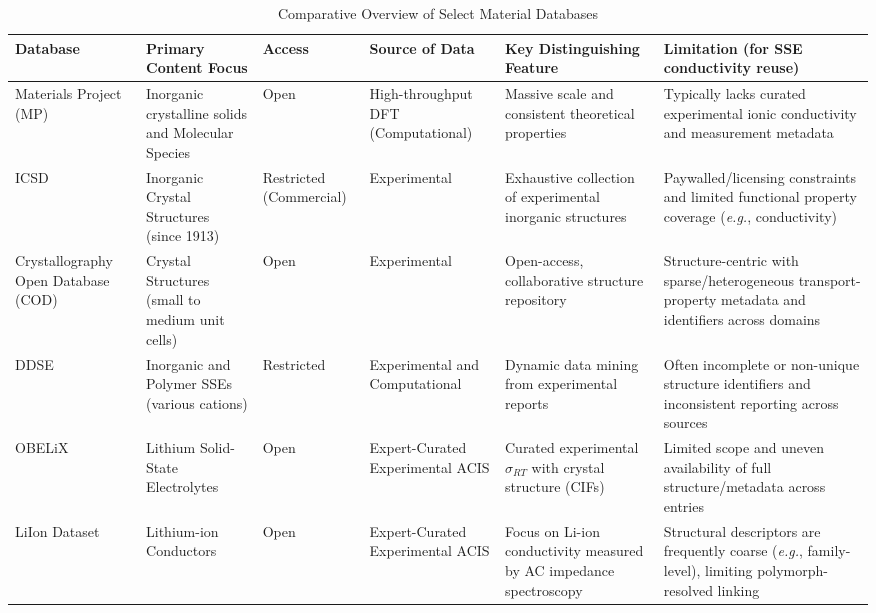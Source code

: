 \documentclass[a4paper,fleqn]{cas-sc}
\begin{document}
\begin{table}[h]
    \centering
    \caption{Comparative Overview of Select Material Databases}
    \label{tab:database_comparison}
    \begin{tabular}{p{0.95in} p{1.05in} p{0.7in} p{0.95in} p{1.1in} p{1.2in}}
        \toprule
        \textbf{Database} & \textbf{Primary Content Focus} & \textbf{Access} & \textbf{Source of Data} & \textbf{Key Distinguishing Feature} & \textbf{Limitation (for SSE conductivity reuse)} \\
        \midrule
        Materials Project (MP) \cite{ye2018harnessing,armiento2020database}
        & Inorganic crystalline solids and Molecular Species \cite{spotte2023database}
        & Open
        & High-throughput DFT (Computational)
        & Massive scale and consistent theoretical properties
        & Typically lacks curated experimental ionic conductivity and measurement metadata \\
        \hline
        ICSD \cite{hellenbrandt2004inorganic,zagorac2019recent}
        & Inorganic Crystal Structures (since 1913)
        & Restricted (Commercial)
        & Experimental
        & Exhaustive collection of experimental inorganic structures
        & Paywalled/licensing constraints and limited functional property coverage (\textit{e.g.}, conductivity) \\
        \hline
        Crystallography Open Database (COD) \cite{grazulis2012crystallography}
        & Crystal Structures (small to medium unit cells)
        & Open
        & Experimental
        & Open-access, collaborative structure repository
        & Structure-centric with sparse/heterogeneous transport-property metadata and identifiers across domains \\
        \hline
        DDSE \cite{yang2024dynamic,yang2024user}
        & Inorganic and Polymer SSEs (various cations)
        & Restricted
        & Experimental and Computational
        & Dynamic data mining from experimental reports
        & Often incomplete or non-unique structure identifiers and inconsistent reporting across sources \\
        \hline
        OBELiX \cite{therrien2025obelix}
        & Lithium Solid-State Electrolytes
        & Open
        & Expert-Curated Experimental ACIS
        & Curated experimental $\sigma_{RT}$ with crystal structure (CIFs)
        & Limited scope and uneven availability of full structure/metadata across entries \\
        \hline
        LiIon Dataset \cite{hargreaves2023database,durdy2023liverpool}
        & Lithium-ion Conductors
        & Open
        & Expert-Curated Experimental ACIS
        & Focus on Li-ion conductivity measured by AC impedance spectroscopy
        & Structural descriptors are frequently coarse (\textit{e.g.}, family-level), limiting polymorph-resolved linking \\
        \bottomrule
    \end{tabular}
\end{table}
\end{document}
